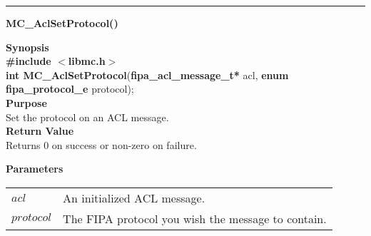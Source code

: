 \noindent
\vspace{5pt}
\rule{6.5in}{0.015in}
\noindent
{}
{\LARGE \bf MC\_AclSetProtocol()}\\
\label{api:MC_Acl_SetProtocol()}

\noindent
{\bf Synopsis}\\
{\bf \#include $<$libmc.h$>$}\\
{\bf int MC\_AclSetProtocol}({\bf fipa\_acl\_message\_t*} acl, {\bf enum fipa\_protocol\_e} protocol);\\

\noindent
{\bf Purpose}\\
Set the protocol on an ACL message.\\

\noindent
{\bf Return Value}\\
Returns 0 on success or non-zero on failure.

\noindent
{\bf Parameters}
\vspace{-0.1in}
\begin{description}
\item
\begin{tabular}{p{10 mm}p{145 mm}} 
$acl$ & An initialized ACL message. \\
$protocol$ & The FIPA protocol you wish the message to contain.
\end{tabular}
\end{description}

